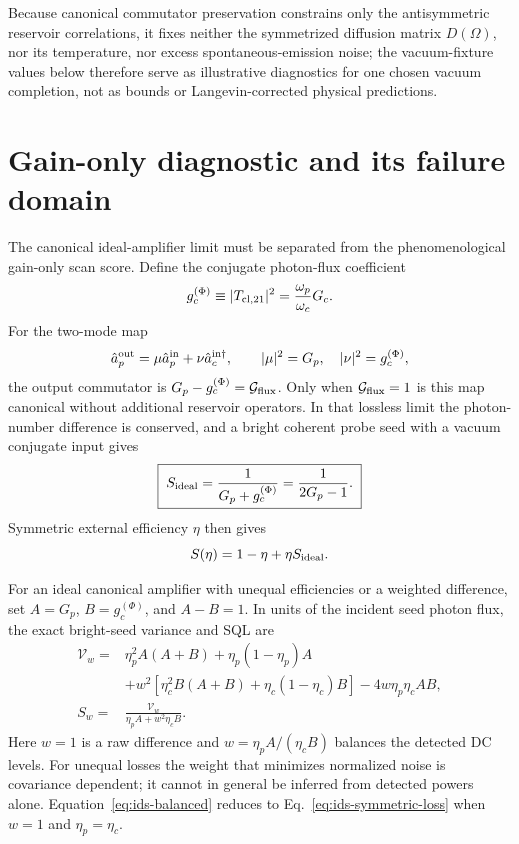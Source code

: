\documentclass[11pt,a4paper]{article}
\begin{document}
Because canonical commutator preservation constrains only the antisymmetric
reservoir correlations, it fixes neither the symmetrized diffusion matrix
$D(\Omega)$, nor its temperature, nor excess spontaneous-emission noise; the
vacuum-fixture values below therefore serve as illustrative diagnostics for one
chosen vacuum completion, not as bounds or Langevin-corrected physical
predictions.

\section{Gain-only diagnostic and its failure domain}
\label{sec:gain-referred-ids}

The canonical ideal-amplifier limit must be separated from the phenomenological
gain-only scan score. Define the conjugate photon-flux coefficient
\begin{equation}
g_c^{(\Phi)}\equiv |T_{{\rm cl},21}|^2
=\frac{\omega_p}{\omega_c}G_c .
\label{eq:conjugate-flux-gain}
\end{equation}
For the two-mode map
\[
\hat a_p^{\rm out}=\mu\hat a_p^{\rm in}
+\nu\hat a_c^{{\rm in}\dagger},\qquad
|\mu|^2=G_p,\quad |\nu|^2=g_c^{(\Phi)},
\]
the output commutator is
$G_p-g_c^{(\Phi)}=\mathcal G_{\rm flux}$. Only when
$\mathcal G_{\rm flux}=1$ is this map canonical without additional reservoir
operators. In that lossless limit the photon-number difference is conserved,
and a bright coherent probe seed with a vacuum conjugate input gives
\begin{equation}
\boxed{\;
S_{\rm ideal}=\frac{1}{G_p+g_c^{(\Phi)}}
=\frac{1}{2G_p-1}.\;}
\label{eq:ids-ideal}
\end{equation}
Symmetric external efficiency $\eta$ then gives
\begin{equation}
S(\eta)=1-\eta+\eta S_{\rm ideal}.
\label{eq:ids-symmetric-loss}
\end{equation}

For an ideal canonical amplifier with unequal efficiencies or a weighted
difference, set $A=G_p$, $B=g_c^{(\Phi)}$, and $A-B=1$. In units of the incident
seed photon flux, the exact bright-seed variance and SQL are
\begin{align}
\mathcal V_w={}&\eta_p^2A(A+B)+\eta_p(1-\eta_p)A\nonumber\\
&+w^2\!\left[\eta_c^2B(A+B)+\eta_c(1-\eta_c)B\right]
-4w\eta_p\eta_cAB,\\
S_w={}&\frac{\mathcal V_w}{\eta_pA+w^2\eta_cB} .
\label{eq:ids-balanced}
\end{align}
Here $w=1$ is a raw difference and $w=\eta_pA/(\eta_cB)$ balances the detected
DC levels. For unequal losses the weight that minimizes normalized noise is
covariance dependent; it cannot in general be inferred from detected powers
alone. Equation~\eqref{eq:ids-balanced} reduces to
Eq.~\eqref{eq:ids-symmetric-loss} when $w=1$ and
$\eta_p=\eta_c$.
\end{document}
